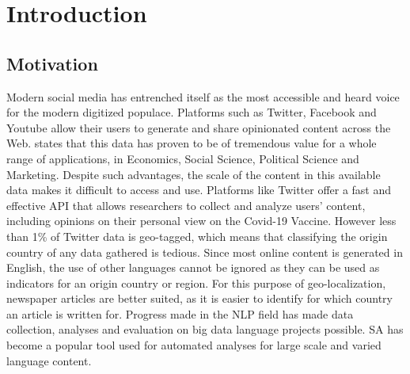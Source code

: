 \chapter{Introduction}


\section{Motivation} %

Modern social media has entrenched itself as the most accessible and heard voice for the modern digitized populace.
Platforms such as Twitter, Facebook and Youtube allow their users to generate and share opinionated content across the Web.
\citet{Balahur2014} states that this data has proven to be of tremendous value for a whole range of applications, in Economics, Social Science, Political Science and Marketing.
Despite such advantages, the scale of the content in this available data makes it difficult to access and use.
Platforms like Twitter offer a fast and effective \ac{API} that allows researchers to collect and analyze users' content, including opinions on their personal view on the Covid-19 Vaccine.
However less than 1\% of Twitter data is geo-tagged, which means that classifying the origin country of any data gathered is tedious.
Since most online content is generated in English, the use of other languages cannot be ignored as they can be used as indicators for an origin country or region.
For this purpose of geo-localization, newspaper articles are better suited, as it is easier to identify for which country an article is written for.
Progress made in the \ac{NLP} field has made data collection, analyses and evaluation on big data language projects possible.
\ac{SA} has become a popular tool used for automated analyses for large scale and varied language content.





